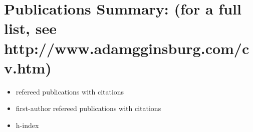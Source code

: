 \setlength{\extrarowheight}{0pt}
\section*{Publications Summary: (for a full list, see http://www.adamgginsburg.com/cv.htm)}
\begin{itemize}
\itemsep-3pt
\item \nrefereed refereed publications with \ncites citations
\item \nfirst first-author refereed publications with \ncitesfirst citations
\item h-index \hindex

\end{itemize}



